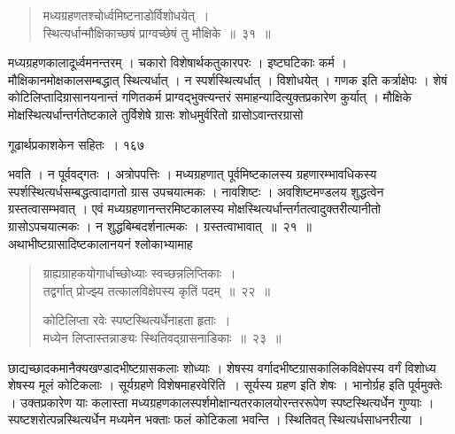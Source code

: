 \documentclass[11pt, openany]{book}
\begin{document}
\begin{quote}
  {\ssi मध्यग्रहणतश्चोर्ध्वमिष्टनाडोर्विशोधयेत्~।\\
स्थित्यर्धान्मौक्षिकाच्छषं प्राग्वच्छेषं तु मौक्षिके~॥~३१~॥}
\end{quote}

\begin{sloppypar}
मध्यग्रहणकालादूर्ध्वमनन्तरम् । चकारो विशेषार्थकतुकारपरः । इष्टघटिकाः कर्म । मौक्षिकानमोक्षकालसम्बद्धात् स्थित्यर्धात् । न स्पर्शस्थित्यर्धात् । विशोधयेत् । गणक इति कर्त्राक्षेपः । शेषं कोटिलिप्तादिग्रासानयनान्तं गणितकर्म प्राग्वद्भुक्त्यन्तरं समाहन्यादित्युक्तप्रकारेण कुर्यात् । मौक्षिके मोक्षस्थित्यर्धान्तर्गतेष्टकाले तुर्विशेषे ग्रासः शोधमुर्वरितो ग्रासोऽवान्तरग्रासो
\end{sloppypar}

\newpage



\hspace{3cm}गूढार्थप्रकाशकेन सहितः~। \hfill १६७
\vspace{1cm}

\begin{sloppypar}
\noindent भवति । न पूर्ववद्गतः । अत्रोपपत्तिः । मध्यग्रहणात् पूर्वमिष्टकालस्य ग्रहणारम्भावधिकस्य स्पर्शस्थित्यर्धसम्बद्धत्वादागतो ग्रास उपचयात्मकः । नावशिष्टः । अवशिष्टमण्डलय शुद्धत्वेन ग्रस्तत्वासम्भवात् । एवं मध्यग्रहणानन्तरमिष्टकालस्य मोक्षस्थित्यर्धान्तर्गतत्वादुक्तरीत्यानीतो ग्रासोऽपचयात्मकः । न शुद्धबिम्बदर्शनात्मकः । ग्रस्तत्वाभावात्~॥~२१~॥\\
\noindent अथाभीष्टग्रासादिष्टकालानयनं श्लोकाभ्यामाह\textendash
\end{sloppypar}


\begin{quote}
  {\ssi ग्राह्यग्राहकयोगार्धाच्छोध्याः स्वच्छन्नलिप्तिकाः~।\\
तद्वर्गात् प्रोज्झ्य तत्कालविक्षेपस्य कृतिं पदम्~॥~२२~॥

कोटिलिप्ता रवेः स्पष्टस्थित्यर्धेनाहता हृताः~।\\
मध्येन लिप्तास्तन्नाङ्यः स्थितिवद्ग्रासनाडिकाः~॥~२३~॥}
\end{quote}

\begin{sloppypar}
 छाद्यच्छादकमानैक्यखण्डादभीष्टग्रासकलाः शोध्याः । शेषस्य वर्गादभीष्टग्रासकालिकविक्षेपस्य वर्गं विशोध्य शेषस्य मूलं कोटिकलाः । सूर्यग्रहणे विशेषमाह\textendash रवेरिति~। सूर्यस्य ग्रहण इति शेषः । भानोर्ग्रह इति पूर्वमुक्तेः । उक्तप्रकारेण याः कलास्ता मध्यग्रहणकालस्पर्शमोक्षान्यतरकालयोरन्तररूपेण स्पष्टस्थित्यर्धेन गुण्याः । स्पष्टशरोत्पन्नस्थित्यर्धेन मध्यमेन भक्ताः फलं कोटिकला भवन्ति । स्थितिवत् स्थित्यर्धसाधनरीत्या ।
\end{sloppypar}
\end{document}
